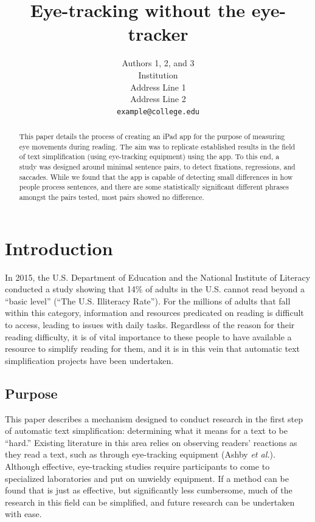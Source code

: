\documentclass[11pt,letterpaper]{article}
\title{Eye-tracking without the eye-tracker
	}
\author{Authors 1, 2, and 3\\
	Institution\\
	Address Line 1\\
	Address Line 2\\
	{\tt example@college.edu}}
\date{}
\begin{document}
	\maketitle
	\begin{abstract}
		This paper details the process of creating an iPad app for the purpose of measuring eye movements during reading. The aim was to replicate established results in the field of text simplification (using eye-tracking equipment) using the app. To this end, a study was designed around minimal sentence pairs, to detect fixations, regressions, and saccades. While we found that the app is capable of detecting small differences in how people process sentences, and there are some statistically significant different phrases amongst the pairs tested, most pairs showed no difference.
	\end{abstract}
	
	\section{Introduction}
	
	In 2015, the U.S. Department of Education and the National Institute of Literacy conducted a study showing that 14\% of adults in the U.S. cannot read beyond a ``basic level'' (``The U.S. Illiteracy Rate''). For the millions of adults that fall within this category, information and resources predicated on reading is difficult to access, leading to issues with daily tasks. Regardless of the reason for their reading difficulty, it is of vital importance to these people to have available a resource to simplify reading for them, and it is in this vein that automatic text simplification projects have been undertaken.
	
	\subsection{Purpose}
	
	This paper describes a mechanism designed to conduct research in the first step of automatic text simplification: determining what it means for a text to be ``hard.'' Existing literature in this area relies on observing readers' reactions as they read a text, such as through eye-tracking equipment (Ashby \textit{et al.}). Although effective, eye-tracking studies require participants to come to specialized laboratories and put on unwieldy equipment. If a method can be found that is just as effective, but significantly less cumbersome, much of the research in this field can be simplified, and future research can be undertaken with ease.
	
\end{document}
